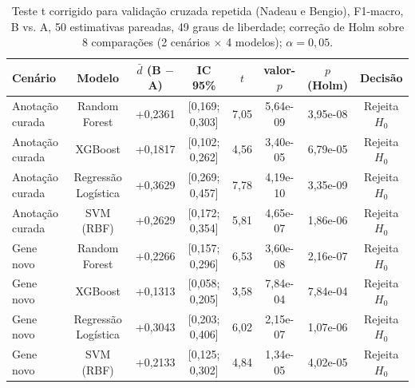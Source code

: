\begin{table}[htbp]
  \centering
  \caption{Teste t corrigido para validação cruzada repetida (Nadeau e Bengio), F1-macro, B vs. A, 50 estimativas pareadas, 49 graus de liberdade; correção de Holm sobre 8 comparações (2 cenários $\times$ 4 modelos); $\alpha = 0{,}05$.}
  \label{tab:teste_t}
  \begin{tabular}{lccccccc}
    \toprule
    Cenário & Modelo & $\bar{d}$ (B $-$ A) & IC 95\% & $t$ & valor-$p$ & $p$ (Holm) & Decisão \\
    \midrule
    Anotação curada & Random Forest & +0,2361 & [0,169; 0,303] & 7,05 & 5,64e-09 & 3,95e-08 & Rejeita $H_0$ \\
    Anotação curada & XGBoost & +0,1817 & [0,102; 0,262] & 4,56 & 3,40e-05 & 6,79e-05 & Rejeita $H_0$ \\
    Anotação curada & Regressão Logística & +0,3629 & [0,269; 0,457] & 7,78 & 4,19e-10 & 3,35e-09 & Rejeita $H_0$ \\
    Anotação curada & SVM (RBF) & +0,2629 & [0,172; 0,354] & 5,81 & 4,65e-07 & 1,86e-06 & Rejeita $H_0$ \\
    Gene novo & Random Forest & +0,2266 & [0,157; 0,296] & 6,53 & 3,60e-08 & 2,16e-07 & Rejeita $H_0$ \\
    Gene novo & XGBoost & +0,1313 & [0,058; 0,205] & 3,58 & 7,84e-04 & 7,84e-04 & Rejeita $H_0$ \\
    Gene novo & Regressão Logística & +0,3043 & [0,203; 0,406] & 6,02 & 2,15e-07 & 1,07e-06 & Rejeita $H_0$ \\
    Gene novo & SVM (RBF) & +0,2133 & [0,125; 0,302] & 4,84 & 1,34e-05 & 4,02e-05 & Rejeita $H_0$ \\
    \bottomrule
  \end{tabular}
\end{table}
